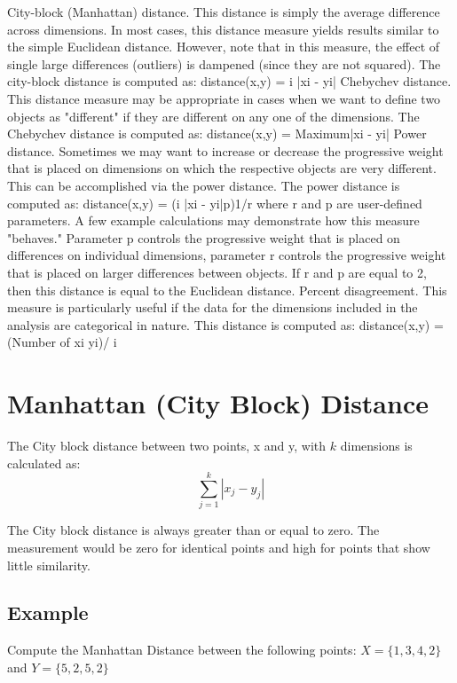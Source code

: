 City-block (Manhattan) distance. This distance is simply the average difference across dimensions. In most cases, this distance measure yields results similar to the simple Euclidean distance. However, note that in this measure, the effect of single large differences (outliers) is dampened (since they are not squared). The city-block distance is computed as:
distance(x,y) = i |xi - yi|
Chebychev distance. This distance measure may be appropriate in cases when we want to define two objects as "different" if they are different on any one of the dimensions. The Chebychev distance is computed as:
distance(x,y) = Maximum|xi - yi|
Power distance. Sometimes we may want to increase or decrease the progressive weight that is placed on dimensions on which the respective objects are very different. This can be accomplished via the power distance. The power distance is computed as:
distance(x,y) = (i |xi - yi|p)1/r
where r and p are user-defined parameters. A few example calculations may demonstrate how this measure "behaves." Parameter p controls the progressive weight that is placed on differences on individual dimensions, parameter r controls the progressive weight that is placed on larger differences between objects. If r and p are equal to 2, then this distance is equal to the Euclidean distance.
Percent disagreement. This measure is particularly useful if the data for the dimensions included in the analysis are categorical in nature. This distance is computed as:
distance(x,y) = (Number of xi  yi)/ i



\section{Manhattan (City Block) Distance}
The City block distance between two points, x and y, with $k$ dimensions is calculated as:
\[ \sum^{k}_{j=1} | x_j - y_j |  \]

The City block distance is always greater than or equal to zero. The measurement would be zero for identical points and high for points that show little similarity.

\subsection{Example}
Compute the Manhattan Distance between the following points: 
$X = \{1,3,4,2\}$ and $Y = \{5,2,5,2\}$


